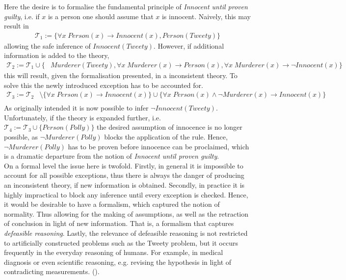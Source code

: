 \documentclass{extarticle}
\begin{document}
Here the desire is to formalise the fundamental principle of \emph{Innocent until proven guilty}, i.e. if $x$ is a person one should assume that $x$ is innocent. Naively, this may result in
\begin{equation*}
\begin{split}
\mathcal{T}_1:= \{ \forall x \; Person(x) \to Innocent(x), Person(Tweety) \} 
\end{split}
\end{equation*}
allowing the safe inference of $Innocent(Tweety)$. However, if additional information is added to the theory,
\begin{equation*}
\begin{split}
\mathcal{T}_2:= \mathcal{T}_1   \cup \{& Murderer(Tweety), \forall x \; Murderer(x) \to Person(x), \forall x \; Murderer(x) \to \neg Innocent(x)\}
\end{split}
\end{equation*}
this will result, given the formalisation presented, in a inconsistent theory. To solve this the newly introduced exception has to be accounted for.
\begin{equation*}
\begin{split}
\mathcal{T}_3:= \mathcal{T}_2 &\setminus \{ \forall x \; Person(x) \to Innocent(x)\}
 \cup \{ \forall x \; Person(x) \wedge \neg Murderer(x) \to Innocent(x)\} \\
\end{split}
\end{equation*}
As originally intended it is now possible to infer $\neg Innocent(Tweety)$. Unfortunately, if the theory is expanded further, i.e. $\mathcal{T}_4:= \mathcal{T}_3   \cup \{ Person(Polly)\}$ the desired assumption of innocence is no longer possible, as $\neg Murderer(Polly)$ blocks the application of the rule. Hence, $\neg Murderer(Polly)$ has to be proven before innocence can be proclaimed, which is a dramatic departure from the notion of \emph{Innocent until proven guilty}.\\

On a formal level the issue here is twofold. Firstly, in general it is impossible to account for all possible exceptions, thus there is always the danger of producing an inconsistent theory, if new information is obtained. Secondly, in practice it is highly impractical to block any inference until every exception is checked. Hence, it would be desirable to have a formalism, which captured the notion of normality. Thus allowing for the making of assumptions, as well as the retraction of conclusion in light of new information. That is, a formalism that captures \emph{defeasible reasoning}. Lastly, the relevance of defeasible reasoning is not restricted to artificially constructed problems such as the Tweety problem, but it occurs frequently in the everyday reasoning of humans. For example, in medical diagnosis or even scientific reasoning, e.g. revising the hypothesis in light of contradicting measurements.  (\cite{reiter1980logic,BOCHMAN2007557,defeasible_stanford2018,nonmonoton_stanford2018}). 
\\
\end{document}
